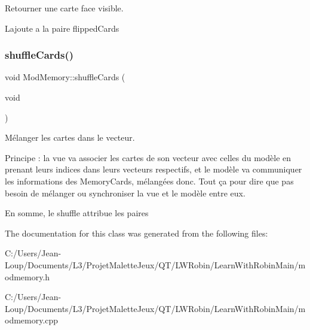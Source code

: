 Retourner une carte face visible. 

L\textquotesingle{}ajoute a la paire flipped\+Cards \mbox{\label{class_mod_memory_ad85f5a28220e641195215e705a928fb1}} 
\subsubsection{\texorpdfstring{shuffle\+Cards()}{shuffleCards()}}
{\footnotesize\ttfamily void Mod\+Memory\+::shuffle\+Cards (\begin{DoxyParamCaption}\item[{void}]{ }\end{DoxyParamCaption})}



Mélanger les cartes dans le vecteur. 

Principe \+: la vue va associer les cartes de son vecteur avec celles du modèle en prenant leurs indices dans leurs vecteurs respectifs, et le modèle va communiquer les informations des Memory\+Cards, mélangées donc. Tout ça pour dire que pas besoin de mélanger ou synchroniser la vue et le modèle entre eux.

En somme, le shuffle attribue les paires 

The documentation for this class was generated from the following files\+:\begin{DoxyCompactItemize}
\item 
C\+:/\+Users/\+Jean-\/\+Loup/\+Documents/\+L3/\+Projet\+Malette\+Jeux/\+Q\+T/\+L\+W\+Robin/\+Learn\+With\+Robin\+Main/modmemory.\+h\item 
C\+:/\+Users/\+Jean-\/\+Loup/\+Documents/\+L3/\+Projet\+Malette\+Jeux/\+Q\+T/\+L\+W\+Robin/\+Learn\+With\+Robin\+Main/modmemory.\+cpp\end{DoxyCompactItemize}
